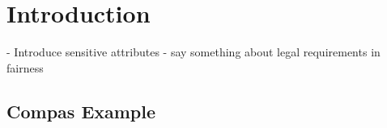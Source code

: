 \chapter{Introduction}

- Introduce sensitive attributes
- say something about legal requirements in fairness

\section{Compas Example}